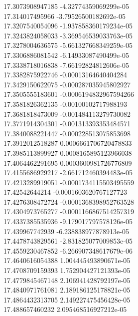 {17.3073908947185 -4.32774359069299e-05 \\
17.314017495966 -3.79526500182692e-05 \\
17.3207540054096 -1.937858360179234e-05 \\
17.3243824058033 -3.369546539033763e-05 \\
17.3278004636575 -5.661327668349259e-05 \\
17.3306886081542 -6.14933087490499e-05 \\
17.3338718016838 -7.66192824812606e-05 \\
17.3382875922746 -0.00013164640404284 \\
17.3429150622075 -0.000287035945802927 \\
17.3505555183601 -0.0006194832967594266 \\
17.3581826362135 -0.00100102717988193 \\
17.3681818473009 -0.001484113279730082 \\
17.3771914304301 -0.001313393353484571 \\
17.3840088221447 -0.000228513075853698 \\
17.3912012518287 0.0006661706720478833 \\
17.3985113899927 0.0008165895123966038 \\
17.4064462291695 0.0003600981726776809 \\
17.4155686929217 -2.661712460394483e-05 \\
17.4213289919051 -0.0001734115503495559 \\
17.42542644214 -0.0001603620767127723 \\
17.4276308472724 -0.0001368398952763528 \\
17.4304973765277 -0.0001166867514257319 \\
17.4337385535936 -9.179017797578126e-05 \\
17.439967742939 -6.238838977878913e-05 \\
17.4478743829561 -2.831825077009853e-05 \\
17.4559230467852 -6.266907348617679e-06 \\
17.4640616054388 1.004445493890671e-05 \\
17.4708709159393 1.752904427121393e-05 \\
17.4779845467148 2.106941428792197e-05 \\
17.4840971761081 2.189186125178821e-05 \\
17.4864432313705 2.149227475456428e-05 \\
17.488657460232 2.095468516927212e-05 \\
}

